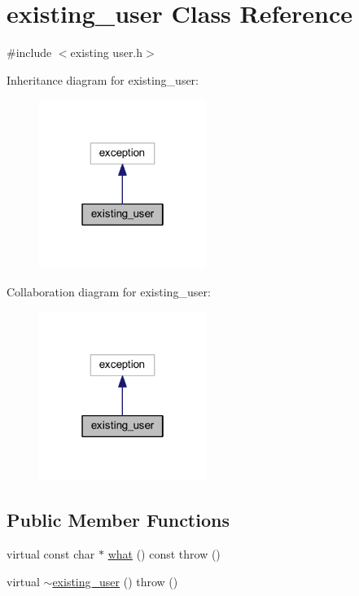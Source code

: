 \hypertarget{classexisting__user}{}\section{existing\+\_\+user Class Reference}
\label{classexisting__user}


{\ttfamily \#include $<$existing user.\+h$>$}



Inheritance diagram for existing\+\_\+user\+:\nopagebreak
\begin{figure}[H]
\begin{center}
\leavevmode
\includegraphics[width=154pt]{classexisting__user__inherit__graph}
\end{center}
\end{figure}


Collaboration diagram for existing\+\_\+user\+:\nopagebreak
\begin{figure}[H]
\begin{center}
\leavevmode
\includegraphics[width=154pt]{classexisting__user__coll__graph}
\end{center}
\end{figure}
\subsection*{Public Member Functions}
\begin{DoxyCompactItemize}
\item 
virtual const char $\ast$ \hyperlink{classexisting__user_a2df7d83617d1c130f36887f5b765760e}{what} () const   throw ()
\item 
virtual \hyperlink{classexisting__user_a1abb8f60e30bb9932f003c64d6d90f59}{$\sim$existing\+\_\+user} ()  throw ()
\end{DoxyCompactItemize}


